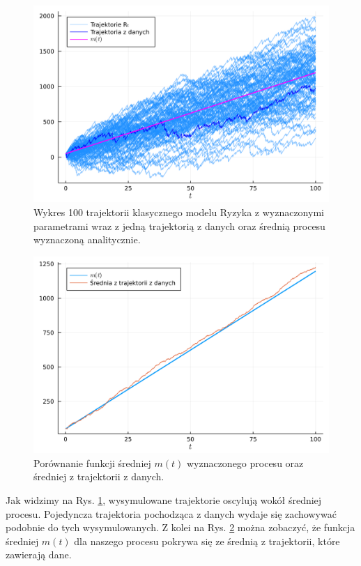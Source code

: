 \documentclass[12pt]{mwart}
\begin{document}
	\begin{figure}[H]
		\centering
		\includegraphics[width=\columnwidth]{fig/trajektorie_2.png}
		\caption{Wykres 100 trajektorii klasycznego modelu Ryzyka z wyznaczonymi parametrami wraz z jedną trajektorią z danych oraz średnią procesu wyznaczoną analitycznie.}
		\label{fig:trajektorie2}
	\end{figure}

	\begin{figure}[H]
		\centering
		\includegraphics[width=\columnwidth]{fig/srednia_porownanie.pdf}
		\caption{Porównanie funkcji średniej $m(t)$ wyznaczonego procesu oraz średniej z trajektorii z danych.}
		\label{fig:średnia}
	\end{figure}

	\noindent Jak widzimy na Rys. \ref{fig:trajektorie2}, wysymulowane trajektorie oscylują wokół średniej procesu. Pojedyncza trajektoria pochodząca z danych wydaje się zachowywać podobnie do tych wysymulowanych. Z kolei na Rys. \ref{fig:średnia} można zobaczyć, że funkcja średniej $m(t)$ dla naszego procesu pokrywa się ze średnią z trajektorii, które zawierają dane.
	
\end{document}
